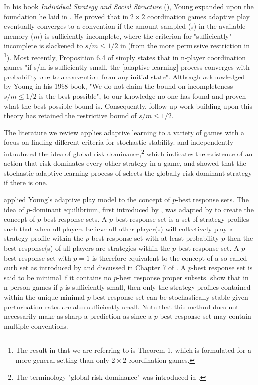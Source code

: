\documentclass[11.5pt]{article}
\begin{document}
In his book \emph{Individual Strategy and Social Structure} (\cite{Young1998}),
 Young expanded upon the foundation he laid in \cite{young1993evolution}. He proved that in 
$2\times 2$ coordination games adaptive play eventually converges to a convention if the amount sampled ($s$) in the available memory ($m$) is sufficiently incomplete, where the criterion for "sufficiently" incomplete is slackened to $s/m \leq 1/2$ in \cite{Young1998} (from the more permissive restriction in \cite{young1993evolution}\footnote{The result in \cite{young1993evolution} that we are referring to is Theorem 1, which is formulated for a more general setting than only $2\times 2$ coordination games.}). 
%
Most recently, Proposition 6.4 of \cite{WALLACE2015327} simply states that in n-player coordination games "if s/m is sufficiently small, the [adaptive learning] process converges with probability one to a convention from any initial state". 
Although acknowledged by Young in his 1998 book, "We do not claim the bound on incompleteness $s/m \leq 1/2$ is the best possible", to our knowledge no one has found and proven what the best possible bound is. Consequently, follow-up work building upon this theory has retained the restrictive bound of $s/m \leq 1/2$. 

The literature we review applies adaptive learning to a variety of games with a focus on finding different criteria for stochastic stability. \cite{maruta1997relationship} and \cite{ellison2000basins} independently introduced the idea of global risk dominance,\footnote{The terminology "global risk dominance" was introduced in \cite{maruta1997relationship}.}  which indicates the existence of an action that risk dominates every other strategy in a game, and showed that the stochastic adaptive learning process of \cite{young1993evolution} selects the globally risk dominant strategy if there is one.

\cite{durieu2011adaptive} applied Young's adaptive play model to the concept of $p$-best response sets. 
The idea of $p$-dominant equilibrium, first introduced by \cite{morris1995p}, was adapted by \cite{tercieux2006p} to create the concept of $p$-best response sets. A $p$-best response set is a set of strategy profiles such that when all players believe all other player(s) will collectively play a strategy profile within the $p$-best response set with at least probability $p$ then the best response(s) of all players are strategies within the $p$-best response set. A $p$-best response set with $p=1$ is therefore equivalent to the concept of a so-called curb set as introduced by \cite{basu1991strategy} and discussed in Chapter 7 of \cite{Young1998}. 
A $p$-best response set is said to be minimal if it contains no $p$-best response proper subsets.  \cite{durieu2011adaptive} show that in n-person games if $p$ is sufficiently small, then only the strategy profiles contained within the 
unique minimal $p$-best response set can be stochastically stable given perturbation rates 
are also sufficiently small. Note that this method does not necessarily make as sharp a prediction as \cite{young1993evolution} since a $p$-best response set may contain multiple conventions.
\end{document}
